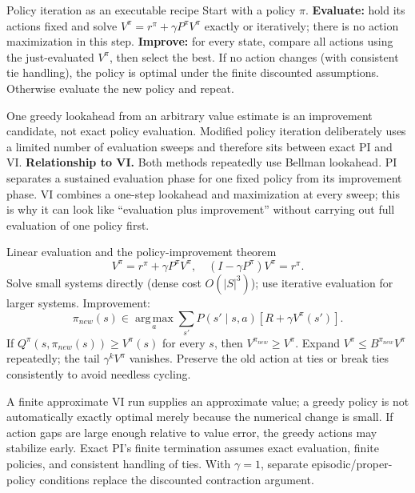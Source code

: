 \documentclass[10pt,a4paper]{article}
\newcommand{\argmax}{\operatorname*{arg\,max}}
\begin{document}
\begin{card}{Policy iteration as an executable recipe}
Start with a policy $\pi$. \textbf{Evaluate:} hold its actions fixed and solve $V^\pi=r^\pi+\gamma P^\pi V^\pi$ exactly or iteratively; there is no action maximization in this step. \textbf{Improve:} for every state, compare all actions using the just-evaluated $V^\pi$, then select the best. If no action changes (with consistent tie handling), the policy is optimal under the finite discounted assumptions. Otherwise evaluate the new policy and repeat.

One greedy lookahead from an arbitrary value estimate is an improvement candidate, not exact policy evaluation. Modified policy iteration deliberately uses a limited number of evaluation sweeps and therefore sits between exact PI and VI.
\textbf{Relationship to VI.} Both methods repeatedly use Bellman lookahead. PI separates a sustained evaluation phase for one fixed policy from its improvement phase. VI combines a one-step lookahead and maximization at every sweep; this is why it can look like ``evaluation plus improvement'' without carrying out full evaluation of one policy first.
\end{card}
\begin{card}{Linear evaluation and the policy-improvement theorem}
\[
V^\pi=r^\pi+\gamma P^\pi V^\pi,
\quad (I-\gamma P^\pi)V^\pi=r^\pi.
\]
Solve small systems directly (dense cost $O(|S|^3)$); use iterative evaluation for larger systems. Improvement:
\[
\pi_{new}(s)\in\argmax_a\sum_{s'}P(s'\mid s,a)[R+\gamma V^\pi(s')].
\]
If $Q^\pi(s,\pi_{new}(s))\ge V^\pi(s)$ for every $s$, then $V^{\pi_{new}}\ge V^\pi$. Expand $V^\pi\le B^{\pi_{new}}V^\pi$ repeatedly; the tail $\gamma^kV^\pi$ vanishes. Preserve the old action at ties or break ties consistently to avoid needless cycling.
\end{card}

\begin{note}
A finite approximate VI run supplies an approximate value; a greedy policy is not automatically exactly optimal merely because the numerical change is small. If action gaps are large enough relative to value error, the greedy actions may stabilize early. Exact PI's finite termination assumes exact evaluation, finite policies, and consistent handling of ties. With $\gamma=1$, separate episodic/proper-policy conditions replace the discounted contraction argument.
\end{note}
\end{document}
